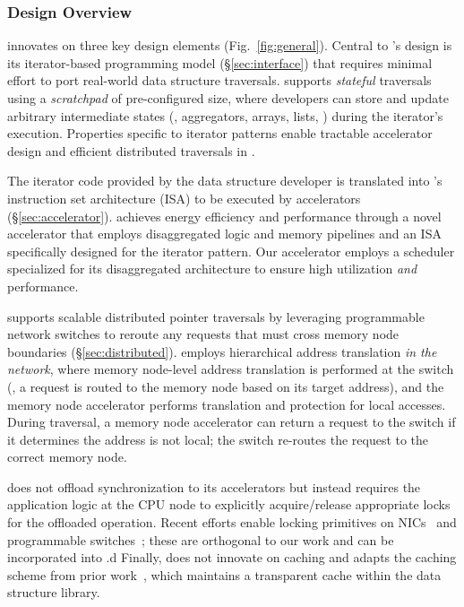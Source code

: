 \subsubsection{\pulse Design Overview}
\label{ssec:overview}


\pulse innovates on three key design elements (Fig.~\ref{fig:general}). Central to \pulse's design is its iterator-based programming model (\S\ref{sec:interface}) that requires minimal effort to port real-world data structure traversals. \pulse supports \emph{stateful} traversals using a \emph{scratchpad} of pre-configured size, where developers can store and update arbitrary intermediate states (\eg, aggregators, arrays, lists, \etc) during the iterator's execution. Properties specific to iterator patterns enable tractable accelerator design and efficient distributed traversals in \pulse. 

The iterator code provided by the data structure developer is translated into \pulse's instruction set architecture (ISA) to be executed by \pulse accelerators (\S\ref{sec:accelerator}). \pulse achieves energy efficiency and performance through a novel accelerator that employs disaggregated logic and memory pipelines and an ISA specifically designed for the iterator pattern. Our accelerator employs a scheduler specialized for its disaggregated architecture to ensure high utilization \emph{and} performance. 


\pulse supports scalable distributed pointer traversals by leveraging programmable network switches to reroute any requests that must cross memory node boundaries (\S\ref{sec:distributed}). \pulse employs hierarchical address translation \emph{in the network}, where memory node-level address translation is performed at the switch (\ie, a request is routed to the memory node based on its target address), and the memory node accelerator performs translation and protection for local accesses. During traversal, a memory node accelerator can return a request to the switch if it determines the address is not local; the switch re-routes the request to the correct memory node.


 \pulse does not offload synchronization to its accelerators but instead requires the application logic at the CPU node to explicitly acquire/release appropriate locks for the offloaded operation. Recent efforts enable locking primitives on NICs~\cite{sherman, clover} and programmable switches~\cite{netlock}; these are orthogonal to our work and can be incorporated into \pulse.d
Finally, \pulse does not innovate on caching and adapts the caching scheme from prior work~\cite{aifm}, which maintains a transparent cache within the data structure library. 
